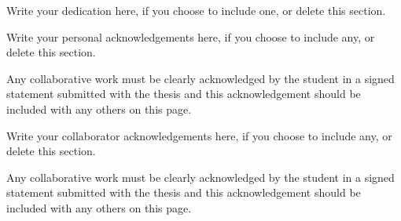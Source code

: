 \begin{thesisfrontmatter}
\maketitlepage


\begin{thesisdedication}

    Write your dedication here, if you choose to include one, or delete this section.\\

\end{thesisdedication}

\begin{thesisacknowledgements}[0]

Write your personal acknowledgements here, if you choose to include any, or delete this section.

Any collaborative work must be clearly acknowledged by the student in a signed statement submitted with the thesis and this acknowledgement should be included with any others on this page.

\end{thesisacknowledgements}

\begin{thesisacknowledgements}[1]

Write your collaborator acknowledgements here, if you choose to include any, or delete this section.

Any collaborative work must be clearly acknowledged by the student in a signed statement submitted with the thesis and this acknowledgement should be included with any others on this page.

\end{thesisacknowledgements}


\begin{publications}
    \publicationtypetitle[0] %
    \publicationtypetitle[1] %
\end{publications}


\tableofcontents
\listoffigures
\listoftables


\end{thesisfrontmatter}